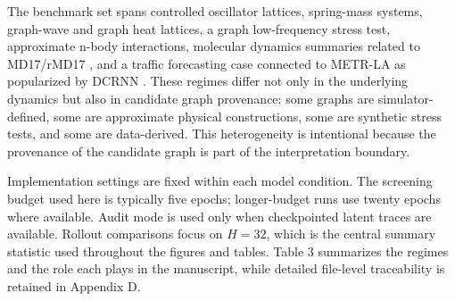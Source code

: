 \documentclass[preprint,12pt]{elsarticle}
\begin{document}
The benchmark set spans controlled oscillator lattices, spring-mass systems, graph-wave and graph heat lattices, a graph low-frequency stress test, approximate n-body interactions, molecular dynamics summaries related to MD17/rMD17 \citep{chmiela2017gdml,christensen2020gradients}, and a traffic forecasting case connected to METR-LA as popularized by DCRNN \citep{li2018dcrnn}. These regimes differ not only in the underlying dynamics but also in candidate graph provenance: some graphs are simulator-defined, some are approximate physical constructions, some are synthetic stress tests, and some are data-derived. This heterogeneity is intentional because the provenance of the candidate graph is part of the interpretation boundary.

Implementation settings are fixed within each model condition. The screening budget used here is typically five epochs; longer-budget runs use twenty epochs where available. Audit mode is used only when checkpointed latent traces are available. Rollout comparisons focus on $H=32$, which is the central summary statistic used throughout the figures and tables. Table 3 summarizes the regimes and the role each plays in the manuscript, while detailed file-level traceability is retained in Appendix D.
\end{document}
